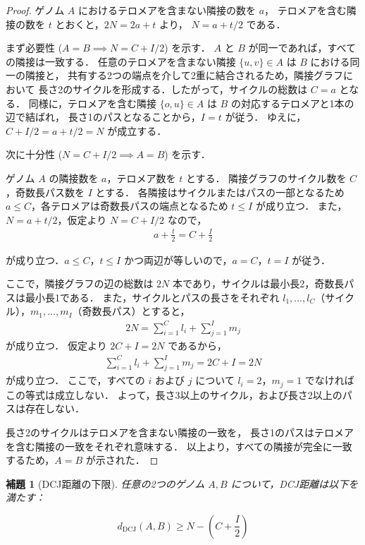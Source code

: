 \documentclass[paper=a4,fontsize=11pt,report,oneside]{jlreq}
\newtheorem{lemma}[theorem]{補題}
\begin{document}
\begin{proof}
ゲノム $A$ におけるテロメアを含まない隣接の数を $a$，
テロメアを含む隣接の数を $t$ とおくと，$2N = 2a + t$ より，
 $N = a + t/2$ である．

まず必要性 ($A=B \implies N = C + I/2$) を示す．
$A$ と $B$ が同一であれば，すべての隣接は一致する．
任意のテロメアを含まない隣接
 $\{u, v\} \in A$ は
$B$ における同一の隣接と，
共有する2つの端点を介して2重に結合されるため，隣接グラフにおいて
長さ2のサイクルを形成する．したがって，サイクルの総数は
 $C=a$ となる．
同様に，テロメアを含む隣接
$\{o, u\} \in A$ は $B$ の対応するテロメアと1本の辺で結ばれ，
長さ1のパスとなることから，$I=t$ が従う．
ゆえに，$C + I/2 = a + t/2 = N$ が成立する．

次に十分性 ($N = C + I/2 \implies A=B$) を示す．

ゲノム $A$ の隣接数を $a$，テロメア数を $t$ とする．
隣接グラフのサイクル数を $C$，奇数長パス数を $I$ とする．
各隣接はサイクルまたはパスの一部となるため $a \leq C$，各テロメアは奇数長パスの端点となるため $t \leq I$ が成り立つ．
また，$N = a + t/2$，仮定より $N = C + I/2$ なので，
\begin{align*}
    a + \frac{t}{2} = C + \frac{I}{2}
\end{align*}

が成り立つ．$a \leq C$，$t \leq I$ かつ両辺が等しいので，$a = C$，$t = I$ が従う．

ここで，隣接グラフの辺の総数は $2N$ 本であり，サイクルは最小長2，奇数長パスは最小長1である．
また，サイクルとパスの長さをそれぞれ $l_1, \ldots, l_C$（サイクル），$m_1, \ldots, m_I$（奇数長パス）とすると，
\begin{align*}
    2N = \sum_{i=1}^{C} l_i + \sum_{j=1}^{I} m_j
\end{align*}
が成り立つ．
仮定より $2C + I = 2N$ であるから，
\begin{align*}
    \sum_{i=1}^{C} l_i + \sum_{j=1}^{I} m_j = 2C + I = 2N
\end{align*}
が成り立つ．
ここで，すべての $i$ および $j$ について $l_i = 2$，$m_j = 1$ でなければこの等式は成立しない．
よって，長さ3以上のサイクル，および長さ2以上のパスは存在しない．

長さ2のサイクルはテロメアを含まない隣接の一致を，
長さ1のパスはテロメアを含む隣接の一致をそれぞれ意味する．
以上より，すべての隣接が完全に一致するため，$A=B$ が示された．
\end{proof}

\begin{lemma}[DCJ距離の下限]
\label{lem:lower_bound}
任意の2つのゲノム $A, B$ について，DCJ距離は以下を満たす：

\begin{equation}
    d_{\mathrm{DCJ}}(A,B) \ge N - \left( C + \frac{I}{2} \right)
\end{equation}
\end{lemma}
\end{document}
